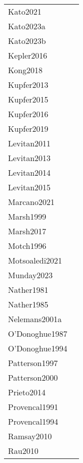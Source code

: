 \documentclass[fleqn,usenatbib]{mnras}
\begin{document}
\begin{table}
\begin{tabular}{lc}
Kato2021 & \citet{Kato2021}\\
Kato2023a & \citet{Kato2023a}\\
Kato2023b & \citet{Kato2023b}\\
Kepler2016 & \citet{Kepler2016}\\
Kong2018 & \citet{Kong2018}\\
Kupfer2013 & \citet{Kupfer2013}\\
Kupfer2015 & \citet{Kupfer2015}\\
Kupfer2016 & \citet{Kupfer2016}\\
Kupfer2019 & \citet{Kupfer2019}\\
Levitan2011 & \citet{Levitan2011}\\
Levitan2013 & \citet{Levitan2013}\\
Levitan2014 & \citet{Levitan2014}\\
Levitan2015 & \citet{Levitan2015}\\
Marcano2021 & \citet{Marcano2021}\\
Marsh1999 & \citet{Marsh1999}\\
Marsh2017 & \citet{Marsh2017}\\
Motch1996 & \citet{Motch1996}\\
Motsoaledi2021 & \citet{Motsoaledi2021}\\
Munday2023 & \citet{Munday2023}\\
Nather1981 & \citet{Nather1981}\\
Nather1985 & \citet{Nather1985}\\
Nelemans2001a & \citet{Nelemans2001a}\\
O'Donoghue1987 & \citet{O'Donoghue1987}\\
O'Donoghue1994 & \citet{O'Donoghue1994}\\
Patterson1997 & \citet{Patterson1997}\\
Patterson2000 & \citet{Patterson2000}\\
Prieto2014 & \citet{Prieto2014}\\
Provencal1991 & \citet{Provencal1991}\\
Provencal1994 & \citet{Provencal1994}\\
Ramsay2010 & \citet{Ramsay2010}\\
Rau2010 & \citet{Rau2010}\\
\hline
\end{tabular}
\end{table}
\end{document}
